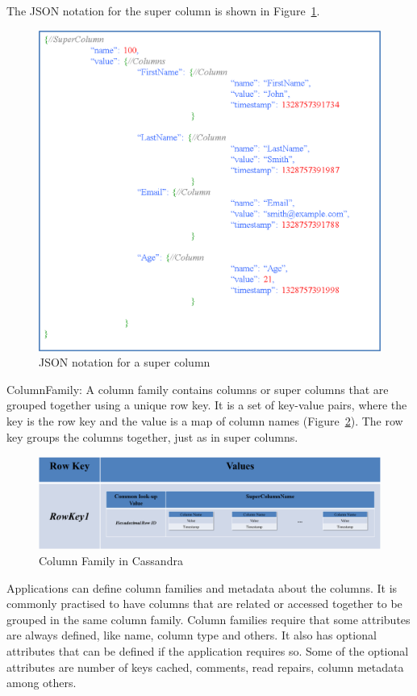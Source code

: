 \begin{description}
The JSON notation for the super column is shown in Figure~\ref{f:supercolumn-JSON}.

\begin{figure}[H]
	\centering
	\includegraphics[width=.7\textwidth]{./figure/Example/JSON-SuperColumn-John.png}
	\caption{JSON notation for a super column}\label{f:supercolumn-JSON}
\end{figure}

\item ColumnFamily: A column family contains columns or super columns that are
grouped together using a unique row key. It is a set of key-value
pairs, where the key is the row key and the value is a map of column names
(Figure~\ref{f:columnfamily}). The row key groups the columns together, just as
in super columns.

\begin{figure}[H]
	\centering
	\includegraphics[width=.8\textwidth]{./figure/Example/ColumnFamily.png}
	\caption{Column Family in Cassandra}\label{f:columnfamily}
\end{figure}

Applications can define column families and metadata about the columns.
It is commonly practised to have columns that are related or accessed
together to be grouped in the same column family. Column families require that
some attributes are always defined, like name, column type and others. It also
has optional attributes that can be defined if the application requires so. Some of the optional
attributes are number of keys cached, comments, read repairs, column
metadata among others.


\end{description}

